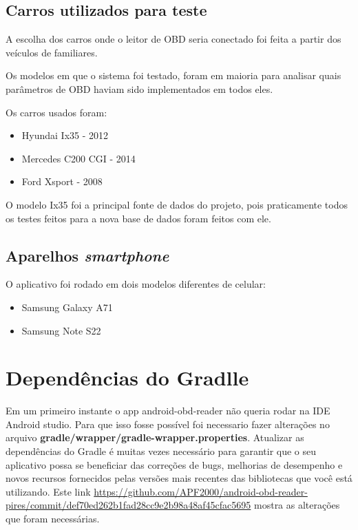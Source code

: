     \subsection{Carros utilizados para teste}

    A escolha dos carros onde o leitor de OBD seria conectado foi feita a partir dos veículos de familiares.

    Os modelos em que o sistema foi testado, foram em maioria para analisar quais parâmetros de OBD haviam sido implementados em todos eles.

    Os carros usados foram:

    \begin{itemize}
        \item Hyundai Ix35 - 2012
        \item Mercedes C200 CGI - 2014
        \item Ford Xsport - 2008
    \end{itemize}

    O modelo Ix35 foi a principal fonte de dados do projeto, pois praticamente todos os testes feitos para a nova base de dados foram feitos com ele.

    \subsection{Aparelhos \textit{smartphone}}

    O aplicativo foi rodado em dois modelos diferentes de celular:
    \begin{itemize}
        \item Samsung Galaxy A71
        \item Samsung Note S22
    \end{itemize}

\section{Dependências do Gradlle}

Em um primeiro instante o app android-obd-reader não queria rodar na IDE Android studio. Para que isso fosse possível foi necessario fazer alterações no arquivo \textbf{gradle/wrapper/gradle-wrapper.properties}. Atualizar as dependências do Gradle  é muitas vezes necessário para garantir que o seu aplicativo possa se beneficiar das correções de bugs, melhorias de desempenho e novos recursos fornecidos pelas versões mais recentes das bibliotecas que você está utilizando. Este link \url{https://github.com/APF2000/android-obd-reader-pires/commit/def70ed262b1fad28cc9e2b98a48af45cfac5695} mostra as alterações que foram necessárias.

